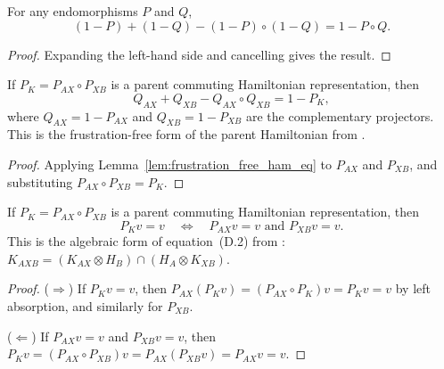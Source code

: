 \begin{lemma}\label{lem:frustration_free_ham_eq}
    \leanok
    For any endomorphisms $P$ and $Q$,
    \[
        (1-P) + (1-Q) - (1-P)\circ(1-Q) = 1 - P\circ Q.
    \]
\end{lemma}

\begin{proof}
    \leanok
    Expanding the left-hand side and cancelling gives the result.
\end{proof}

\begin{theorem}%
    \label{thm:hamiltonian_eq}
    \leanok
    If $P_K = P_{AX} \circ P_{XB}$ is a parent commuting Hamiltonian
    representation, then
    \[
        Q_{AX} + Q_{XB} - Q_{AX} \circ Q_{XB} = 1 - P_K,
    \]
    where $Q_{AX} = 1 - P_{AX}$ and $Q_{XB} = 1 - P_{XB}$ are the
    complementary projectors.
    This is the frustration-free form of the parent Hamiltonian from
    \cite[Appendix~D, Section~D.2]{Cirac2016MPDO_arXiv}.
\end{theorem}

\begin{proof}
    \leanok
    Applying Lemma~\ref{lem:frustration_free_ham_eq} to $P_{AX}$ and
    $P_{XB}$, and substituting $P_{AX} \circ P_{XB} = P_K$.
\end{proof}

\begin{theorem}\label{thm:mem_ground_iff}
    \leanok
    If $P_K = P_{AX} \circ P_{XB}$ is a parent commuting Hamiltonian
    representation, then
    \[
        P_K v = v
        \quad\Longleftrightarrow\quad
        P_{AX} v = v \text{ and }  P_{XB} v = v.
    \]
    This is the algebraic form of equation~(D.2) from
    \cite{Cirac2016MPDO_arXiv}:
    $K_{AXB} = (K_{AX} \otimes H_B) \cap (H_A \otimes K_{XB})$.
\end{theorem}

\begin{proof}
    \leanok
    ($\Rightarrow$) If $P_K v = v$, then $P_{AX}(P_K v) = (P_{AX} \circ P_K) v
        = P_K v = v$ by left absorption, and similarly for $P_{XB}$.

    ($\Leftarrow$) If $P_{AX} v = v$ and $P_{XB} v = v$, then
    $P_K v = (P_{AX} \circ P_{XB}) v = P_{AX}(P_{XB} v) = P_{AX} v = v$.
\end{proof}
